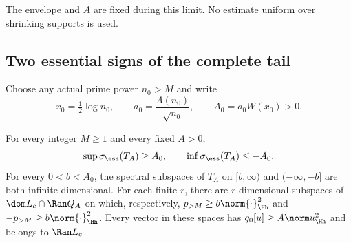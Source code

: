 The envelope and $A$ are fixed during this limit.  No estimate uniform
over shrinking supports is used.

\subsection{Two essential signs of the complete tail}
\label{vfourA:subsec:essential-signs}

Choose any actual prime power $n_0>M$ and write
\begin{equation}\label{vfourA:eq:packet-constant}
 x_0=\tfrac12\log n_0,\qquad
 a_0=\frac{\Lambda(n_0)}{\sqrt{n_0}},\qquad
 A_0=a_0W(x_0)>0.
\end{equation}

\begin{theorem}
\label{vfourA:thm:essential-signs}
For every integer $M\ge1$ and every fixed $A>0$,
\begin{equation}\label{vfourA:eq:essential-edges}
 \sup\sigma_{\ess}(T_A)\ge A_0,\qquad
 \inf\sigma_{\ess}(T_A)\le-A_0.
\end{equation}
For every $0<b<A_0$, the spectral subspaces of $T_A$ on
$[b,\infty)$ and $(-\infty,-b]$ are both infinite dimensional.
For each finite $r$, there are $r$-dimensional subspaces of
$\dom L_c\cap\Ran Q_A$ on which, respectively,
$p_{>M}\ge b\norm{\cdot}_{\Hh}^2$ and
$-p_{>M}\ge b\norm{\cdot}_{\Hh}^2$.
Every vector in these spaces has
$q_0[u]\ge A\norm u_{\Hh}^2$ and belongs to $\Ran L_c$.
\end{theorem}
